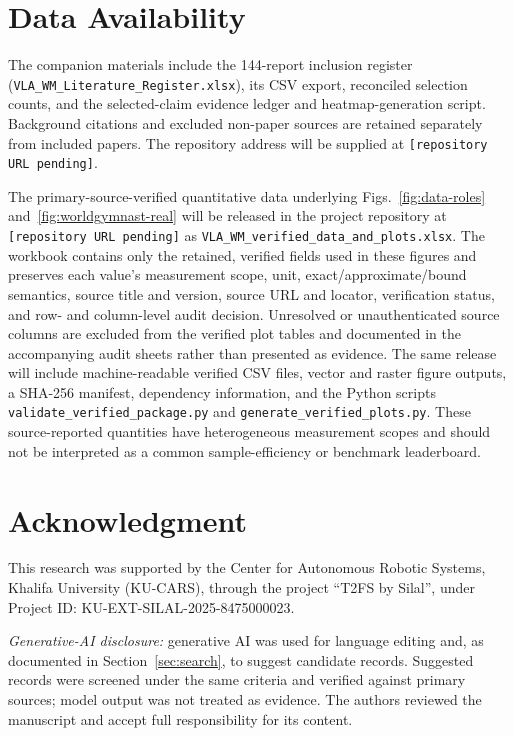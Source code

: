 \documentclass{ieeeaccess}
\providecommand{\RepoURL}{\texttt{[repository URL pending]}}
\begin{document}
\section*{Data Availability}
\textcolor[RGB]{104,48,148}{The companion materials include the 144-report inclusion register (\texttt{VLA\_WM\_Literature\_Register.xlsx}), its CSV export, reconciled selection counts, and the selected-claim evidence ledger and heatmap-generation script. Background citations and excluded non-paper sources are retained separately from included papers. The repository address will be supplied at \RepoURL{}.}

The primary-source-verified quantitative data underlying
Figs.~\ref{fig:data-roles} and~\ref{fig:worldgymnast-real} will be released in
the project repository at \RepoURL{} as
\texttt{VLA\_WM\_verified\_data\_and\_plots.xlsx}. The workbook contains only
the retained, verified fields used in these figures and preserves each value's
measurement scope, unit, exact/approximate/bound semantics, source title and
version, source URL and locator, verification status, and row- and
column-level audit decision. Unresolved or unauthenticated source columns are
excluded from the verified plot tables and documented in the accompanying
audit sheets rather than presented as evidence. The same release will include
machine-readable verified CSV files, vector and raster figure outputs, a
SHA-256 manifest, dependency information, and the Python scripts
\texttt{validate\_verified\_package.py} and
\texttt{generate\_verified\_plots.py}. These source-reported quantities have
heterogeneous measurement scopes and should not be interpreted as a common
sample-efficiency or benchmark leaderboard.



\section*{Acknowledgment}
This research was supported by the Center for Autonomous Robotic Systems, Khalifa University (KU-CARS), through the project ``T2FS by Silal'', under Project ID: KU-EXT-SILAL-2025-8475000023.

\emph{Generative-AI disclosure:} generative AI was used for language editing
and, as documented in Section~\ref{sec:search}, to suggest candidate records.
Suggested records were screened under the same criteria and verified against
primary sources; model output was not treated as evidence. The authors reviewed
the manuscript and accept full responsibility for its content.
\end{document}
